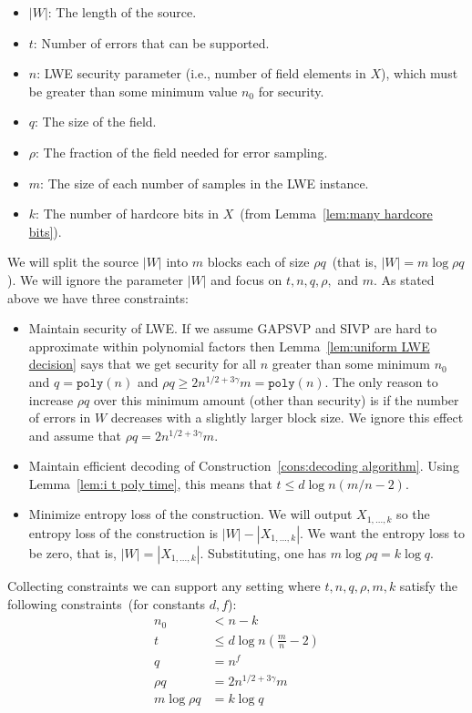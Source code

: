 \documentclass[11pt]{article}
\newcommand{\lemref}[1]{\mbox{Lemma~\ref{#1}}}
\newcommand{\poly}{\ensuremath{\mathtt{poly}}\xspace}
\begin{document}
\begin{itemize}
\item $|W|$: The length of the source.  
\item $t$: Number of errors that can be supported.  
\item $n$: LWE security parameter (i.e., number of field elements in $X$), which must be greater than some minimum value $n_0$ for security.
\item $q$: The size of the field.  
\item $\rho$: The fraction of the field needed for error sampling.  
\item $m$: The size of each number of samples in the LWE instance.  
\item $k$: The number of hardcore bits in $X$~(from \lemref{lem:many hardcore bits}).
\end{itemize}
We will split the source $|W|$ into $m$ blocks each of size $\rho q$~(that is, $|W| = m\log \rho q$).  We will ignore the parameter $|W|$ and focus on $t, n, q, \rho,$ and $m$.  As stated above we have three constraints:
\begin{itemize}
\item Maintain security of LWE.  If we assume GAPSVP and SIVP are hard to approximate within polynomial factors then \lemref{lem:uniform LWE decision} says that we get security for all $n$ greater than some minimum $n_0$ and $q = \poly(n)$ and $\rho q \geq 2 n^{1/2 + 3\gamma} m = \poly(n)$.  The only reason to increase $\rho q$ over this minimum amount (other than security) is if the number of errors in $W$ decreases with a slightly larger block size.  We ignore this effect and assume that $\rho q = 2n^{1/2+3\gamma}m$.
\item Maintain efficient decoding of Construction~\ref{cons:decoding algorithm}.  Using \lemref{lem:i t poly time}, this means that $t\leq d\log n(m/n-2)$.
\item Minimize entropy loss of the construction.  We will output $X_{1,...,k}$ so the entropy loss of the construction is $|W|-|X_{1,..., k}|$.  We want the entropy loss to be zero, that is, $|W| = |X_{1,..., k}|$.  Substituting, one has $m\log \rho q = k \log q$.
\end{itemize}
Collecting constraints we can support any setting where $t, n, q, \rho, m, k$ satisfy the following constraints~(for constants $d, f$):
\begin{align*}
n_0&< n -k \\
t&\leq d \log n\left(\frac{m}{n}-2\right)\\
q &= n^f\\
\rho q  &= 2n^{1/2+3\gamma}m\\
m\log \rho q &= k \log q
\end{align*}
\end{document}
